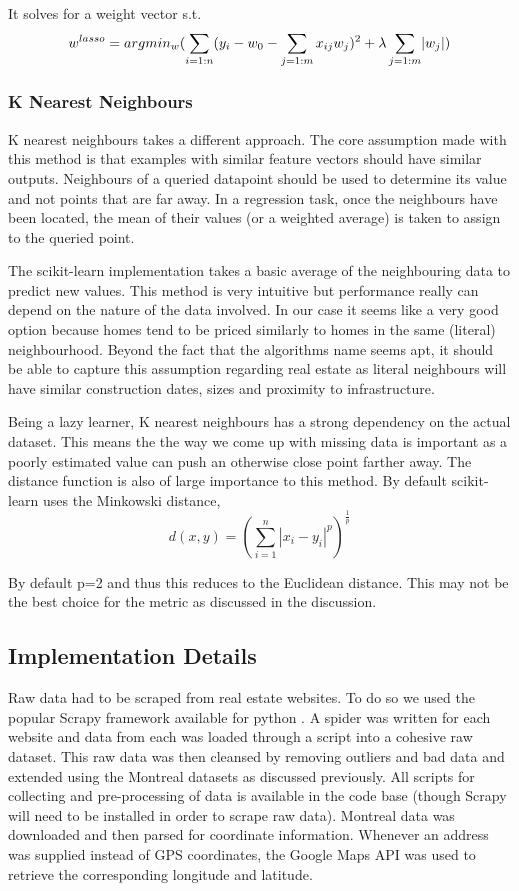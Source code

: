 \documentclass{acm_proc_article-sp}
\DeclarePairedDelimiter{\abs}{\lvert}{\rvert}
\begin{document}
	It solves for a weight vector s.t. \\
	\[ w^{lasso} = argmin_{w}(\sum_{i=1:n}(y_{i} - w_{0} - \sum_{j=1:m}x_{ij}w_{j})^{2} + \lambda\sum_{j=1:m}\abs{w_{j}}) \]
	
	
\subsubsection{K Nearest Neighbours}
	K nearest neighbours takes a different approach. The core assumption made with this method is that examples with similar feature vectors should have similar outputs. Neighbours of a queried datapoint should be used to determine its value and not points that are far away. In a regression task, once the neighbours have been located, the mean of their values (or a weighted average) is taken to assign to the queried point.
	
	The scikit-learn implementation takes a basic average of the neighbouring data to predict new values. This method is very intuitive but performance really can depend on the nature of the data involved. In our case it seems like a very good option because homes tend to be priced similarly to homes in the same (literal) neighbourhood. Beyond the fact that the algorithms name seems apt, it should be able to capture this assumption regarding real estate as literal neighbours will have similar construction dates, sizes and proximity to infrastructure.
	
	Being a lazy learner, K nearest neighbours has a strong dependency on the actual dataset. This means the the way we come up with missing data is important as a poorly estimated value can push an otherwise close point farther away. The distance function is also of large importance to this method. By default scikit-learn uses the Minkowski distance,
	\[ d(x, y) = (\sum_{i=1}^n | x_i - y_i|^p)^{\frac{1}{p}} \]
	
	 By default p=2 and thus this reduces to the Euclidean distance. This may not be the best choice for the metric as discussed in the discussion.

\subsection{Implementation Details}

	Raw data had to be scraped from real estate websites. To do so we used the popular Scrapy framework available for python \cite{scrapy}. A spider was written for each website and data from each was loaded through a script into a cohesive raw dataset. This raw data was then cleansed by removing outliers and bad data and extended using the Montreal datasets as discussed previously. All scripts for collecting and pre-processing of data is available in the code base (though Scrapy will need to be installed in order to scrape raw data). Montreal data was downloaded and then parsed for coordinate information. Whenever an address was supplied instead of GPS coordinates, the Google Maps API was used to retrieve the corresponding longitude and latitude.
	
\end{document}
